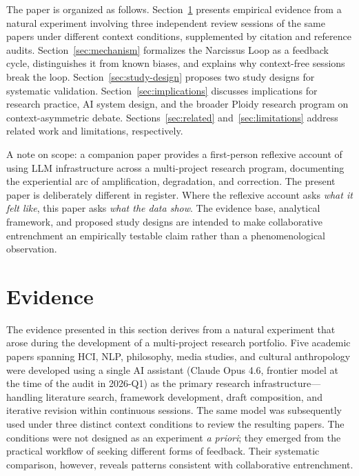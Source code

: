 \documentclass[12pt]{article}
\begin{document}
The paper is organized as follows. Section~\ref{sec:evidence} presents empirical evidence from a natural experiment involving three independent review sessions of the same papers under different context conditions, supplemented by citation and reference audits. Section~\ref{sec:mechanism} formalizes the Narcissus Loop as a feedback cycle, distinguishes it from known biases, and explains why context-free sessions break the loop. Section~\ref{sec:study-design} proposes two study designs for systematic validation. Section~\ref{sec:implications} discusses implications for research practice, AI system design, and the broader Ploidy research program on context-asymmetric debate. Sections~\ref{sec:related} and~\ref{sec:limitations} address related work and limitations, respectively.

A note on scope: a companion paper provides a first-person reflexive account of using LLM infrastructure across a multi-project research program, documenting the experiential arc of amplification, degradation, and correction. The present paper is deliberately different in register. Where the reflexive account asks \emph{what it felt like}, this paper asks \emph{what the data show}. The evidence base, analytical framework, and proposed study designs are intended to make collaborative entrenchment an empirically testable claim rather than a phenomenological observation.

\section{Evidence}
\label{sec:evidence}

The evidence presented in this section derives from a natural experiment that arose during the development of a multi-project research portfolio. Five academic papers spanning HCI, NLP, philosophy, media studies, and cultural anthropology were developed using a single AI assistant (Claude Opus 4.6, frontier model at the time of the audit in 2026-Q1) as the primary research infrastructure---handling literature search, framework development, draft composition, and iterative revision within continuous sessions. The same model was subsequently used under three distinct context conditions to review the resulting papers. The conditions were not designed as an experiment \textit{a priori}; they emerged from the practical workflow of seeking different forms of feedback. Their systematic comparison, however, reveals patterns consistent with collaborative entrenchment.
\end{document}
